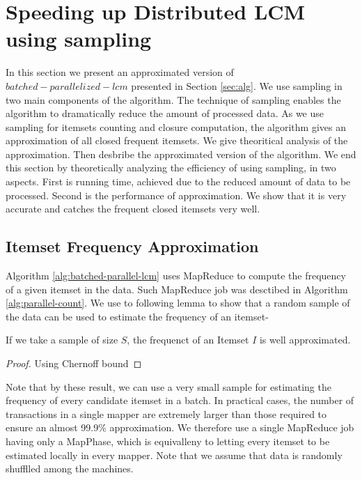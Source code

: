 \section{Speeding up Distributed LCM using sampling}
\label{sec:alg-sampling}
In this section we present an approximated version of
$batched-parallelized-lcm$ presented in Section
\ref{sec:alg}. We use sampling in two main components 
of the algorithm. The technique of sampling enables 
the algorithm to dramatically reduce the amount of 
processed data. As we use sampling for itemsets counting
and closure computation, the algorithm gives an
approximation of all closed frequent itemsets. We give
theoritical analysis of the approximation. Then desbribe the 
approximated version of the algorithm. We end this section by theoretically analyzing 
the efficiency of using sampling, in two aspects. First is 
running time, achieved due to the reduced amount of data 
to be processed. Second is the performance of approximation. 
We show that it is very accurate and catches the frequent 
closed itemsets very well.

\subsection{Itemset Frequency Approximation}
Algorithm \ref{alg:batched-parallel-lcm} uses MapReduce
to compute the frequency of a given itemset in the
data. Such MapReduce job was desctibed in Algorithm
\ref{alg:parallel-count}. We use to following lemma to
show that a random sample of the data can be used
to estimate the frequency of an itemset-

\begin{lemma}
If we take a sample of size $S$, the frequenct of an Itemset
$I$ is well approximated.
\end{lemma}

\begin{proof}
Using Chernoff bound
\end{proof}

Note that by these result, we can use a very small sample
for estimating the frequency of every candidate itemset in a
batch. In practical cases, the number of transactions in a
single mapper are extremely larger than those required to
ensure an almost 99.9\% approximation. We therefore use a
single MapReduce job having only a MapPhase, which is
equivalleny to letting every itemset to be estimated locally
in every mapper. Note that we assume that data is randomly
shufflled among the machines.

